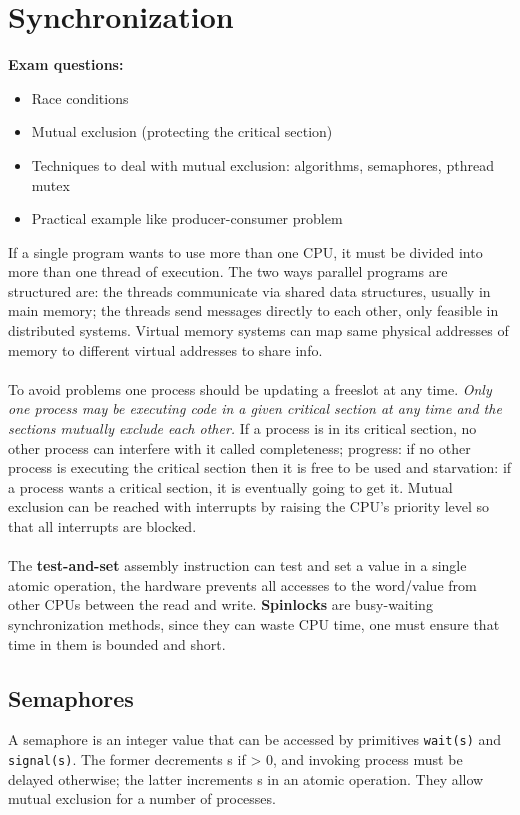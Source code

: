 \documentclass[twoside]{article}
\begin{document}
\section{Synchronization}
\textbf{Exam questions:}
\begin{itemize}
\item Race conditions
\item Mutual exclusion (protecting the critical section)
\item Techniques to deal with mutual exclusion: algorithms, semaphores, pthread mutex
\item Practical example like producer-consumer problem
\end{itemize}
If a single program wants to use more than one CPU, it must be divided into more than one thread of execution. The two ways parallel programs are structured are: the threads communicate via shared data structures, usually in main memory; the threads send messages directly to each other, only feasible in distributed systems. Virtual memory systems can map same physical addresses of memory to different virtual addresses to share info.\\ \\
To avoid problems one process should be updating a freeslot at any time. \emph{Only one process may be executing code in a given critical section at any time and the sections mutually exclude each other.} If a process is in its critical section, no other process can interfere with it called completeness; progress: if no other process is executing the critical section then it is free to be used and starvation: if a process wants a critical section, it is eventually going to get it. Mutual exclusion can be reached with interrupts by raising the CPU's priority level so that all interrupts are blocked.\\ \\
The \textbf{test-and-set} assembly instruction can test and set a value in a single atomic operation, the hardware prevents all accesses to the word/value from other CPUs between the read and write. \textbf{Spinlocks} are busy-waiting synchronization methods, since they can waste CPU time, one must ensure that time in them is bounded and short.
\subsection{Semaphores}
A semaphore is an integer value that can be accessed by primitives \texttt{wait(s)} and \texttt{signal(s)}. The former decrements s if > 0, and invoking process must be delayed otherwise; the latter increments s in an atomic operation. They allow mutual exclusion for a number of processes.
\end{document}
